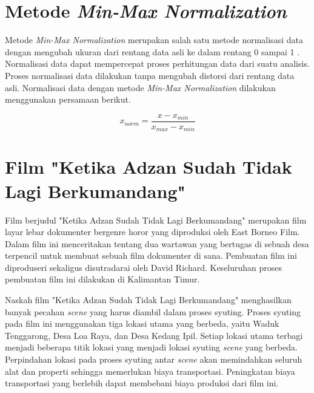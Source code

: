 \section{Metode \textit{Min-Max Normalization}}
\vspace{-4mm}
{\frenchspacing
    Metode \textit{Min-Max Normalization} merupakan salah satu metode normalisasi data dengan mengubah ukuran dari rentang data asli ke dalam rentang 0 sampai 1 .
    Normalisasi data dapat mempercepat proses perhitungan data dari suatu analisis.
    Proses normalisasi data dilakukan tanpa mengubah distorsi dari rentang data asli.
    Normalisasi data dengan metode \textit{Min-Max Normalization} dilakukan menggunakan persamaan berikut.

    \begin{equation}
        \label{pers: normalisasi minmax}
        x_{norm} = \frac{x - x_{min}}{x_{max} - x_{min}}
    \end{equation}

}
\vspace{-3mm}

\section{Film "Ketika Adzan Sudah Tidak Lagi Berkumandang"}
\vspace{-4mm}
{\frenchspacing
    Film berjudul "Ketika Adzan Sudah Tidak Lagi Berkumandang" merupakan film layar lebar dokumenter bergenre horor yang diproduksi oleh East Borneo Film.
    Dalam film ini menceritakan tentang dua wartawan yang bertugas di sebuah desa terpencil untuk membuat sebuah film dokumenter di sana.
    Pembuatan film ini diproduseri sekaligus disutradarai oleh David Richard.
    Keseluruhan proses pembuatan film ini dilakukan di Kalimantan Timur.

    Naskah film "Ketika Adzan Sudah Tidak Lagi Berkumandang" menghasilkan banyak pecahan \textit{scene} yang harus diambil dalam proses syuting.
    Proses syuting pada film ini menggunakan tiga lokasi utama yang berbeda, yaitu Waduk Tenggarong, Desa Loa Raya, dan Desa Kedang Ipil.
    Setiap lokasi utama terbagi menjadi beberapa titik lokasi yang menjadi lokasi syuting \textit{scene} yang berbeda.
    Perpindahan lokasi pada proses syuting antar \textit{scene} akan memindahkan seluruh alat dan properti sehingga memerlukan biaya transportasi.
    Peningkatan biaya transportasi yang berlebih dapat membebani biaya produksi dari film ini.
}
\vspace{-3mm}

\pagebreak